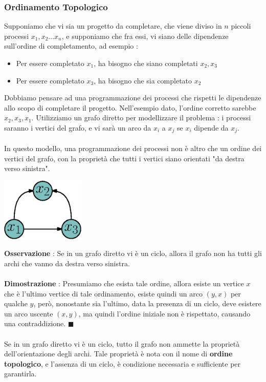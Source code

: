 \documentclass[12pt, letterpaper]{article}
\newcommand{\acc}{\\\hphantom{}\\}
\begin{document}
\subsubsection{Ordinamento Topologico}
Supponiamo che vi sia un progetto da completare, che viene diviso in \(n\) piccoli processi 
\(x_1,x_2\dots x_n\), e supponiamo che fra essi, vi siano delle dipendenze sull'ordine di completamento, ad 
esempio : \begin{itemize}
    \item Per essere completato \(x_1\), ha bisogno che siano completati \(x_2,x_3\)
    \item Per essere completato \(x_3\), ha bisogno che sia completato \(x_2\)
\end{itemize}
Dobbiamo pensare ad una programmazione dei processi che rispetti le dipendenze allo scopo di completare il progetto.
Nell'esempio dato, l'ordine corretto sarebbe \(x_2,x_3,x_1\). Utilizziamo un grafo diretto per modellizzare il 
problema : i processi saranno i vertici del grafo, e vi sarà un arco da \(x_i\) a \(x_j\) se \(x_i\) dipende 
da \(x_j\).\acc In questo modello, una programmazione dei processi non è altro che un ordine dei vertici 
del grafo, con la proprietà che tutti i vertici siano orientati "da destra verso sinistra".\begin{center}
    \includegraphics[width=0.3\textwidth ]{images/processiGrafo.eps}
\end{center}
\textbf{Osservazione} : Se in un grafo diretto vi è un ciclo, allora il grafo non ha tutti gli archi che vanno 
da destra verso sinistra. \acc 
\textbf{Dimostrazione} : Presumiamo che esista tale ordine, allora esiste un vertice \(x\) che è l'ultimo vertice 
di tale ordinamento, esiste quindi un arco \((y,x)\) per qualche \(y\), però, nonostante sia l'ultimo, 
data la presenza di un ciclo, deve esistere un arco uscente \((x,y)\), ma quindi l'ordine iniziale non è rispettato, 
causando una contraddizione. \(\blacksquare\)\acc 
Se in un grafo diretto vi è un ciclo, tutto il grafo non ammette la proprietà dell'orientazione degli archi. Tale 
proprietà è nota con il nome di \textbf{ordine topologico}, e l'assenza di un ciclo, è condizione necessaria 
e sufficiente per garantirla.\acc 
\end{document}

